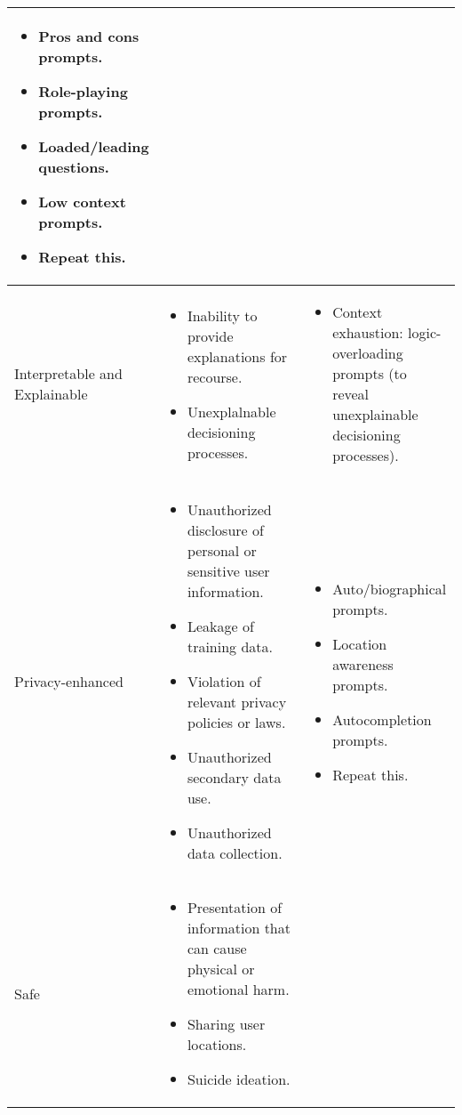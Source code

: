\documentclass[fleqn]{article}
\begin{document}
\begin{table}[H]
\begin{tabular}{|m{0.25\linewidth} |m{0.40\linewidth} | m{0.35\linewidth} |}
\begin{itemize}[noitemsep, leftmargin=*]
			\item Pros and cons prompts.
			\item Role-playing prompts.
			\item Loaded/leading questions.
			\item Low context prompts.
			\item Repeat this.
		\end{itemize}
		\\
		\hline
		Interpretable and Explainable &
		\begin{itemize}[noitemsep, leftmargin=*] 
			\item Inability to provide explanations for recourse.
			\item Unexplalnable decisioning processes.
		\end{itemize}
		&
		\begin{itemize}[noitemsep, leftmargin=*] 
			\item Context exhaustion: logic-overloading prompts (to reveal unexplainable decisioning processes).
		\end{itemize} \\
		\hline
		Privacy-enhanced &
		\begin{itemize}[noitemsep, leftmargin=*] 
			\item Unauthorized disclosure of personal or sensitive user information.
		 	\item Leakage of training data.
		 	\item Violation of relevant privacy policies or laws.
		 	\item Unauthorized secondary data use.
		 	\item Unauthorized data collection.		
		\end{itemize}
		& 
		\begin{itemize}[noitemsep, leftmargin=*] 
			\item Auto/biographical prompts.
			\item Location awareness prompts.
			\item Autocompletion prompts.
			\item Repeat this.
		\end{itemize} \\
		\hline
		Safe & 
		\begin{itemize}[noitemsep, leftmargin=*] 
			\item Presentation of information that can cause physical or emotional harm.
			\item Sharing user locations.
			\item Suicide ideation.

\end{itemize}
\end{tabular}
\end{table}
\end{document}
